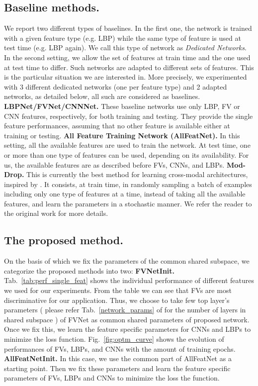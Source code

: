 \documentclass{sig-alternate-05-2015}
\begin{document}
\subsection{Baseline methods.} 
We report two different types of baselines. In the first one, the network is trained with a given feature type (e.g. LBP) while the same type of feature is used at test time (e.g. LBP again). We call this type of network as \emph{Dedicated Networks}. In the second setting, we allow the set of features at train time and the one used at test time to differ. Such networks are adapted to different sets of features. This is the particular situation we are interested in. More precisely, we experimented with 3 different dedicated networks (one per feature type) and 2 adapted networks, as detailed below, all such are considered as baselines. 
\textbf{LBPNet/FVNet/CNNNet.}
These baseline networks use only LBP, FV or CNN features, respectively, for both training and testing. They provide the single feature performances, assuming that no other feature is available either at training or testing.
\textbf{All Feature Training Network (AllFeatNet).}
In this setting, all the available features are used to train the network. At test time, one or more than one type of features can be used, depending on its availability. For us, the available features are as described before FVs, CNNs, and LBPs. 
\textbf{Mod-Drop.} This is currently the best method for learning cross-modal architectures, inspired by \cite{neverova2015oddrop}. It consists, at train time, in randomly sampling a batch of examples including only one type of features at a time, instead of taking all the available features, and learn the parameters in a stochastic manner. We refer the reader to the original work \cite{neverova2015oddrop} for more details.
 
\subsection{The proposed method.}
On the basis of which we fix the parameters of the common shared subspace, we categorize the proposed methods into two:
\textbf{FVNetInit.} Tab.~\ref{tab:perf_single_feat} shows the individual performance of different features we used for our experiments. From the table we can see that FVs are most discriminative for our application. Thus, we choose to take few top layer's parameters ( please refer Tab.~\ref{network_params} of for the number of layers in shared subspace ) of FVNet as common shared parameters of proposed network. Once we fix this, we learn the feature specific parameters for CNNs and LBPs to minimize the loss function. Fig.~\ref{fig:optm_curve} shows the evolution of performances of FVs, LBPs, and CNNs with the amount of training epochs. 
\textbf{AllFeatNetInit.} In this case, we use the common part of AllFeatNet as a starting point. Then we fix these parameters and learn the feature specific parameters of FVs, LBPs and CNNs to minimize the loss the function. 
\end{document}
